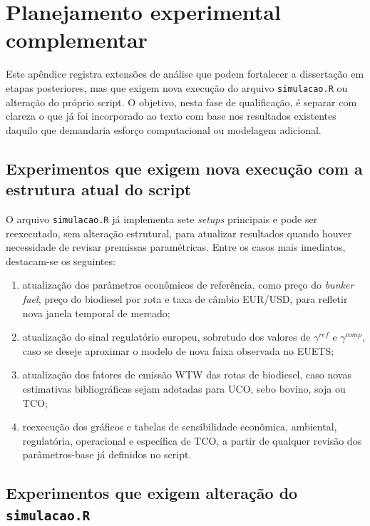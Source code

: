 \chapter{Planejamento experimental complementar}
\label{ap:planejamento_experimental}

Este apêndice registra extensões de análise que podem fortalecer a dissertação em etapas posteriores, mas que exigem nova execução do arquivo \texttt{simulacao.R} ou alteração do próprio script. O objetivo, nesta fase de qualificação, é separar com clareza o que já foi incorporado ao texto com base nos resultados existentes daquilo que demandaria esforço computacional ou modelagem adicional.

\section{Experimentos que exigem nova execução com a estrutura atual do script}

O arquivo \texttt{simulacao.R} já implementa sete \emph{setups} principais e pode ser reexecutado, sem alteração estrutural, para atualizar resultados quando houver necessidade de revisar premissas paramétricas. Entre os casos mais imediatos, destacam-se os seguintes:

\begin{enumerate}
    \item atualização dos parâmetros econômicos de referência, como preço do \emph{bunker fuel}, preço do biodiesel por rota e taxa de câmbio EUR/USD, para refletir nova janela temporal de mercado;
    \item atualização do sinal regulatório europeu, sobretudo dos valores de $\gamma^{ref}$ e $\gamma^{comp}$, caso se deseje aproximar o modelo de nova faixa observada no \gls{EUETS};
    \item atualização dos fatores de emissão \gls{WTW} das rotas de biodiesel, caso novas estimativas bibliográficas sejam adotadas para \gls{UCO}, sebo bovino, soja ou \gls{TCO};
    \item reexecução dos gráficos e tabelas de sensibilidade econômica, ambiental, regulatória, operacional e específica de \gls{TCO}, a partir de qualquer revisão dos parâmetros-base já definidos no script.
\end{enumerate}

\section{Experimentos que exigem alteração do \texttt{simulacao.R}}

